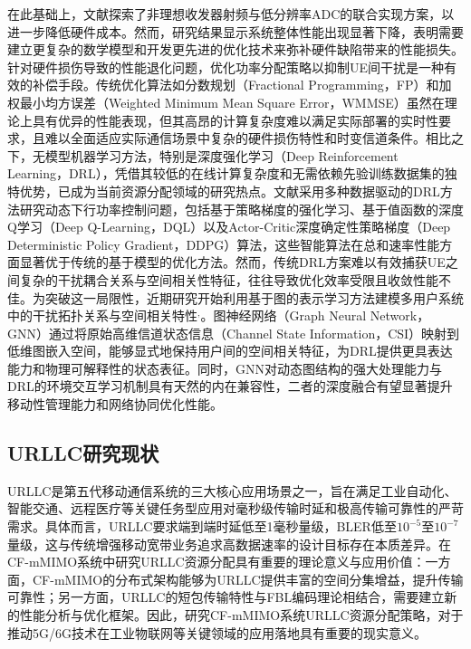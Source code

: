 在此基础上，文献\textcite{chapterone13}探索了非理想收发器射频与低分辨率ADC的联合实现方案，以进一步降低硬件成本。然而，研究结果显示系统整体性能出现显著下降，表明需要建立更复杂的数学模型和开发更先进的优化技术来弥补硬件缺陷带来的性能损失。针对硬件损伤导致的性能退化问题，优化功率分配策略以抑制UE间干扰是一种有效的补偿手段。传统优化算法如分数规划（Fractional Programming，FP）和加权最小均方误差（Weighted Minimum Mean Square Error，WMMSE）虽然在理论上具有优异的性能表现，但其高昂的计算复杂度难以满足实际部署的实时性要求，且难以全面适应实际通信场景中复杂的硬件损伤特性和时变信道条件\cite{chapterone30}。相比之下，无模型机器学习方法，特别是深度强化学习（Deep Reinforcement Learning，DRL），凭借其较低的在线计算复杂度和无需依赖先验训练数据集的独特优势，已成为当前资源分配领域的研究热点\cite{chapterone31}。文献\textcite{chapterone30}采用多种数据驱动的DRL方法研究动态下行功率控制问题，包括基于策略梯度的强化学习、基于值函数的深度Q学习（Deep Q-Learning，DQL）以及Actor-Critic深度确定性策略梯度（Deep Deterministic Policy Gradient，DDPG）算法，这些智能算法在总和速率性能方面显著优于传统的基于模型的优化方法。然而，传统DRL方案难以有效捕获UE之间复杂的干扰耦合关系与空间相关性特征，往往导致优化效率受限且收敛性能不佳\cite{chapterone32}。为突破这一局限性，近期研究开始利用基于图的表示学习方法建模多用户系统中的干扰拓扑关系与空间相关特性\cite{chapterone33}$^,$\cite{chapterone34}。图神经网络（Graph Neural Network，GNN）通过将原始高维信道状态信息（Channel State Information，CSI）映射到低维图嵌入空间，能够显式地保持用户间的空间相关特征，为DRL提供更具表达能力和物理可解释性的状态表征。同时，GNN对动态图结构的强大处理能力与DRL的环境交互学习机制具有天然的内在兼容性，二者的深度融合有望显著提升移动性管理能力和网络协同优化性能。

\subsection{URLLC研究现状}

URLLC是第五代移动通信系统的三大核心应用场景之一，旨在满足工业自动化、智能交通、远程医疗等关键任务型应用对毫秒级传输时延和极高传输可靠性的严苛需求。具体而言，URLLC要求端到端时延低至1毫秒量级，BLER低至$10^{-5}$至$10^{-7}$量级，这与传统增强移动宽带业务追求高数据速率的设计目标存在本质差异。在CF-mMIMO系统中研究URLLC资源分配具有重要的理论意义与应用价值：一方面，CF-mMIMO的分布式架构能够为URLLC提供丰富的空间分集增益，提升传输可靠性；另一方面，URLLC的短包传输特性与FBL编码理论相结合，需要建立新的性能分析与优化框架。因此，研究CF-mMIMO系统URLLC资源分配策略，对于推动5G/6G技术在工业物联网等关键领域的应用落地具有重要的现实意义。

